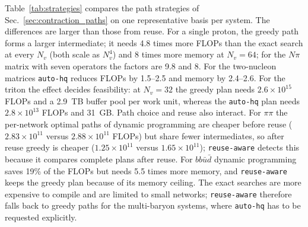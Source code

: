 \documentclass[a4paper,fleqn]{cas-dc}
\begin{document}
Table~\ref{tab:strategies} compares the path strategies of
Sec.~\ref{sec:contraction_paths} on one representative basis per system. The
differences are larger than those from reuse. For a single proton, the greedy
path forms a larger intermediate; it needs 4.8 times more FLOPs than the exact
search at every \(N_v\) (both scale as \(N_v^4\)) and 8 times more memory at
\(N_v=64\); for the \(N\pi\) matrix with seven operators the
factors are 9.8 and 8. For the two-nucleon matrices \texttt{auto-hq} reduces FLOPs
by 1.5--2.5 and memory by 2.4--2.6. For the triton the effect decides
feasibility: at \(N_v=32\) the greedy plan needs \(2.6\times10^{15}\) FLOPs and a 2.9~TB
buffer pool per work unit, whereas the \texttt{auto-hq} plan needs
\(2.8\times10^{13}\) FLOPs and 31~GB. Path choice and reuse also interact. For
\(\pi\pi\) the per-network optimal paths of dynamic programming are cheaper before
reuse (\(2.83\times10^{11}\) versus \(2.88\times10^{11}\) FLOPs) but share fewer
intermediates, so after reuse greedy is cheaper (\(1.25\times10^{11}\) versus
\(1.65\times10^{11}\)); \texttt{reuse-aware} detects this because it compares complete
plans after reuse. For \(bb\bar u\bar d\) dynamic programming saves 19\% of the
FLOPs but needs 5.5 times more memory, and \texttt{reuse-aware} keeps the greedy
plan because of its memory ceiling. The exact searches are more expensive to
compile and are limited to small networks; \texttt{reuse-aware} therefore falls
back to greedy paths for the multi-baryon systems, where \texttt{auto-hq} has to
be requested explicitly.
\end{document}
